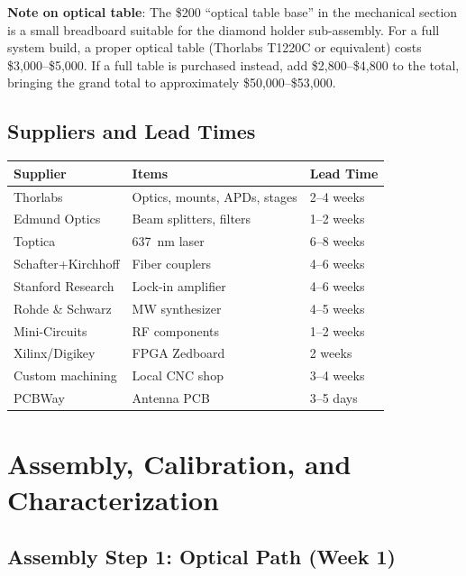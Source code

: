 \documentclass[11pt,a4paper,openany]{book}
\begin{document}
\noindent
\textbf{Note on optical table}: The \$200 ``optical table base'' in the mechanical section is a small breadboard suitable for the diamond holder sub-assembly. For a full system build, a proper optical table (Thorlabs T1220C or equivalent) costs \$3,000--\$5,000. If a full table is purchased instead, add \$2,800--\$4,800 to the total, bringing the grand total to approximately \$50,000--\$53,000.

\section{Suppliers and Lead Times}

\begin{center}
\begin{tabular}{lll}
\toprule
\textbf{Supplier} & \textbf{Items} & \textbf{Lead Time} \\
\midrule
Thorlabs & Optics, mounts, APDs, stages & 2--4 weeks \\
Edmund Optics & Beam splitters, filters & 1--2 weeks \\
Toptica & 637~nm laser & 6--8 weeks \\
Schafter+Kirchhoff & Fiber couplers & 4--6 weeks \\
Stanford Research & Lock-in amplifier & 4--6 weeks \\
Rohde \& Schwarz & MW synthesizer & 4--5 weeks \\
Mini-Circuits & RF components & 1--2 weeks \\
Xilinx/Digikey & FPGA Zedboard & 2 weeks \\
Custom machining & Local CNC shop & 3--4 weeks \\
PCBWay & Antenna PCB & 3--5 days \\
\bottomrule
\end{tabular}
\end{center}



\chapter{Assembly, Calibration, and Characterization}\label{ch:assembly}

\section{Assembly Step 1: Optical Path (Week 1)}
\end{document}
